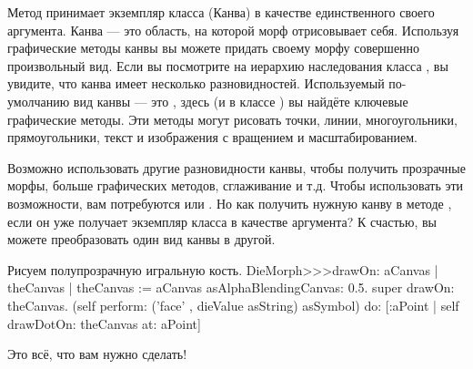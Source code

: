 \documentclass[a4paper,10pt,twoside]{book}
\begin{document}
Метод  принимает экземпляр класса  (Канва) в качестве единственного своего аргумента.
Канва --- это область, на которой морф отрисовывает себя.
Используя графические методы канвы вы можете придать своему морфу совершенно произвольный вид.
Если вы посмотрите на иерархию наследования класса , вы увидите, что канва имеет несколько разновидностей.
Используемый по-умолчанию вид канвы --- это , здесь (и в классе ) вы найдёте ключевые графические методы.
Эти методы могут рисовать точки, линии, многоугольники, прямоугольники, текст и изображения с вращением и масштабированием.

Возможно использовать другие разновидности канвы, чтобы получить прозрачные морфы, больше графических методов, сглаживание и т.д.
Чтобы использовать эти возможности, вам потребуются  или .
Но как получить нужную канву в методе , если он уже получает экземпляр класса  в качестве аргумента?
К счастью, вы можете преобразовать один вид канвы в другой.

\begin{method}{Рисуем полупрозрачную игральную кость.}
DieMorph>>>drawOn: aCanvas
	| theCanvas |
	theCanvas := aCanvas asAlphaBlendingCanvas: 0.5.
	super drawOn: theCanvas.
	(self perform: ('face' , dieValue asString) asSymbol)
		do: [:aPoint | self drawDotOn: theCanvas at: aPoint]
\end{method}
\noindent
Это всё, что вам нужно сделать!
\end{document}
